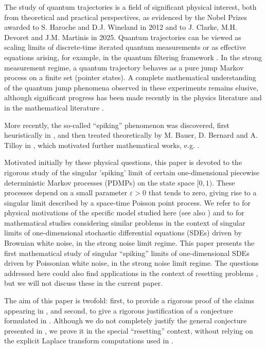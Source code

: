 \documentclass[reqno, 12pt, a4paper]{amsart}
\theoremstyle{plain}
\theoremstyle{definition}
\begin{document}
The study of quantum trajectories \cite{BP02,WM10} is a field of significant physical interest, both from theoretical and practical perspectives, as evidenced by the Nobel Prizes awarded to S. Haroche and D.J. Wineland \cite{HW12} in 2012 and to J. Clarke, M.H. Devoret and J.M. Martinis \cite{CDM25} in 2025. Quantum trajectories can be viewed as scaling limits of discrete-time iterated quantum measurements \cite{AP06,P10} or as effective equations arising, for example, in the quantum filtering framework \cite{BVHJ09}. In the strong measurement regime, a quantum trajectory behaves as a pure jump Markov process on a finite set (pointer states). A complete mathematical understanding of the quantum jump phenomena observed in these experiments remains elusive, although significant progress has been made recently in the physics literature \cite{BBB12, BBT15} and in the mathematical literature \cite{BCFFS17, BBCCNP21, F22, FR24}.

More recently, the so-called ``spiking'' phenomenon was discovered, first heuristically in \cite{GP92,MW98,CBJP06,CBJ12}, and then treated theoretically by M. Bauer, D. Bernard and A. Tilloy in \cite{TBB15,BBT16,BB18}, which motivated further mathematical works, e.g. \cite{KL19,BCCNP23,BCNP25}.

Motivated initially by these physical questions, this paper is devoted to the rigorous study of the singular 'spiking' limit of certain one-dimensional piecewise deterministic Markov processes (PDMPs) on the state space $[0,1)$. These processes depend on a small parameter $\varepsilon>0$ that tends to zero, giving rise to a singular limit described by a space-time Poisson point process. We refer to \cite{SBDKC25} for physical motivations of the specific model studied here (see also \cite{DCD23}) and to \cite{BCCNP23} for mathematical studies considering similar problems in the context of singular limits of one-dimensional stochastic differential equations (SDEs) driven by Brownian white noise, in the strong noise limit regime. This paper presents the first mathematical study of singular ``spiking'' limits of one-dimensional SDEs driven by Poissonian white noise, in the strong noise limit regime. The questions addressed here could also find applications in the context of resetting problems \cite{EM11, EMS20,NG23}, but we will not discuss these in the current paper.

The aim of this paper is twofold: first, to provide a rigorous proof of the claims appearing in \cite{SBDKC25}, and second, to give a rigorous justification of a conjecture formulated in \cite{SBDKC25}. Although we do not completely justify the general conjecture presented in \cite{SBDKC25}, we prove it in the special ``resetting'' context, without relying on the explicit Laplace transform computations used in \cite{SBDKC25}.
\medskip 
\end{document}
